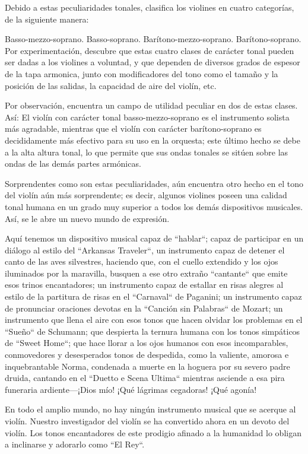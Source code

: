 \documentclass[12pt]{book}
\begin{document}
Debido a estas peculiaridades tonales, clasifica los violines en cuatro categorías, de la siguiente manera:

Basso-mezzo-soprano.
Basso-soprano.
Barítono-mezzo-soprano.
Barítono-soprano.
Por experimentación, descubre que estas cuatro clases de carácter tonal pueden ser dadas a los violines a voluntad, y que dependen de diversos grados de espesor de la tapa armonica, junto con modificadores del tono como el tamaño y la posición de las salidas, la capacidad de aire del violín, etc.

Por observación, encuentra un campo de utilidad peculiar en dos de estas clases. Así: El violín con carácter tonal basso-mezzo-soprano es el instrumento solista más agradable, mientras que el violín con carácter barítono-soprano es decididamente más efectivo para su uso en la orquesta; este último hecho se debe a la alta altura tonal, lo que permite que sus ondas tonales se sitúen sobre las ondas de las demás partes armónicas.

Sorprendentes como son estas peculiaridades, aún encuentra otro hecho en el tono del violín aún más sorprendente; es decir, algunos violines poseen una calidad tonal humana en un grado muy superior a todos los demás dispositivos musicales. Así, se le abre un nuevo mundo de expresión.

Aquí tenemos un dispositivo musical capaz de ``hablar``; capaz de participar en un diálogo al estilo del ``Arkansas Traveler``, un instrumento capaz de detener el canto de las aves silvestres, haciendo que, con el cuello extendido y los ojos iluminados por la maravilla, busquen a ese otro extraño ``cantante`` que emite esos trinos encantadores; un instrumento capaz de estallar en risas alegres al estilo de la partitura de risas en el ``Carnaval`` de Paganini; un instrumento capaz de pronunciar oraciones devotas en la ``Canción sin Palabras`` de Mozart; un instrumento que llena el aire con esos tonos que hacen olvidar los problemas en el ``Sueño`` de Schumann; que despierta la ternura humana con los tonos simpáticos de ``Sweet Home``; que hace llorar a los ojos humanos con esos incomparables, conmovedores y desesperados tonos de despedida, como la valiente, amorosa e inquebrantable Norma, condenada a muerte en la hoguera por su severo padre druida, cantando en el ``Duetto e Scena Ultima`` mientras asciende a esa pira funeraria ardiente—¡Dios mío! ¡Qué lágrimas cegadoras! ¡Qué agonía!

En todo el amplio mundo, no hay ningún instrumento musical que se acerque al violín. Nuestro investigador del violín se ha convertido ahora en un devoto del violín. Los tonos encantadores de este prodigio afinado a la humanidad lo obligan a inclinarse y adorarlo como ``El Rey``.
\end{document}
